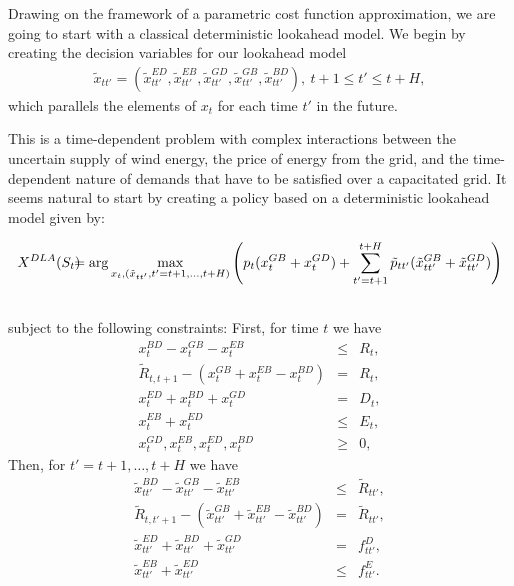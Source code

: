 \documentclass[11pt,oneside,fleqn,reqno,titlepage]{article}
\newcommand{\bn}{\begin{eqnarray}}
\newcommand{\en}{\end{eqnarray}}
\newcommand{\bns}{\begin{eqnarray*}}
\newcommand{\ens}{\end{eqnarray*}}
\newcommand{\argmax}{{\rm arg}\max}
\def \ptilde{{\tilde p}}
\def \xtilde{{\tilde x}}
\def \Rtilde{{\tilde R}}
\begin{document}
Drawing on the framework of a parametric cost function approximation, we are going to start with a classical deterministic lookahead model.  We begin by creating the decision variables for our lookahead model
\bns
\xtilde_{tt'} = (\xtilde^{ED}_{tt'},\xtilde^{EB}_{tt'},\xtilde^{GD}_{tt'},\xtilde^{GB}_{tt'},\xtilde^{BD}_{tt'}), ~t+1 \leq  t' \leq t+H,
\ens
which parallels the elements of $x_t$ for each time $t'$ in the future.

This is a time-dependent problem with complex interactions between the uncertain supply of wind energy, the price of energy from the grid, and the time-dependent nature of demands that have to be satisfied over a capacitated grid.  It seems natural to start by creating a policy based on a deterministic lookahead model given by:

{\small
\bn
X^{DLA}(S_t) \hspace{-.10in}& = &\hspace{-.10in} \argmax_{x_t,(\xtilde_{tt'},t'=t+1, \ldots, t+H)} \left(p_t (x^{GB}_t + x^{GD}_t) + \sum_{t'=t+1}^{t+H} \ptilde_{tt'} (\xtilde^{GB}_{tt'} + \xtilde^{GD}_{tt'}) \right) \nonumber \\
& &\label{eq:DLA0}
\en
}
subject to the following constraints: First, for time $t$ we have
\bn
x^{BD}_{t} - x^{GB}_{t} - x^{EB}_{t} & \leq & R_{t}, \label{eq:DLA1} \\
\Rtilde_{t,t+1}- (x^{GB}_{t} + x^{EB}_{t} - x^{BD}_{t}) &=& R_{t}, \label{eq:DLA2}\\
x^{ED}_{t} + x^{BD}_{t} + x^{GD}_{t} & = & D_{t},\label{eq:DLA3}\\
x^{EB}_{t} + x^{ED}_{t}  & \leq & E_{t}, \label{eq:DLA4} \\
x^{GD}_t, x^{EB}_t, x^{ED}_t, x^{BD}_t & \geq & 0, \label{eq:DLA5}
\en
Then, for $t' = t+1, \ldots, t+H$ we have
\bn
\xtilde^{BD}_{tt'} - \xtilde^{GB}_{tt'} - \xtilde^{EB}_{tt'} & \leq & \Rtilde_{tt'}, \label{eq:DLA6} \\
\Rtilde_{t,t'+1}- (\xtilde^{GB}_{tt'} + \xtilde^{EB}_{tt'} - \xtilde^{BD}_{tt'}) &=& \Rtilde_{tt'}, \label{eq:DLA7}\\
\xtilde^{ED}_{tt'} + \xtilde^{BD}_{tt'} + \xtilde^{GD}_{tt'} & = & f^D_{tt'},\label{eq:DLA8}\\
\xtilde^{EB}_{tt'} + \xtilde^{ED}_{tt'}  & \leq & f^E_{tt'}. \label{eq:DLA9}
\en
\end{document}

